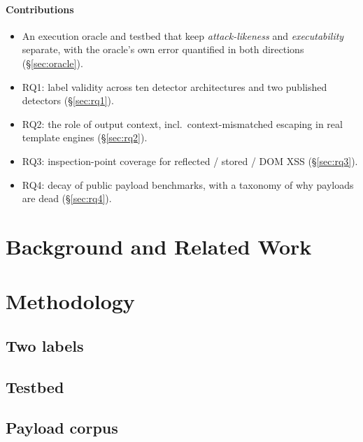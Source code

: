 \documentclass[sigconf,anonymous,review]{acmart}
\begin{document}
\paragraph{Contributions}
\begin{itemize}
  \item An execution oracle and testbed that keep \emph{attack-likeness} and \emph{executability} separate, with the oracle's own error quantified in both directions (\S\ref{sec:oracle}).
  \item RQ1: label validity across ten detector architectures and two published detectors (\S\ref{sec:rq1}).
  \item RQ2: the role of output context, incl.\ context-mismatched escaping in real template engines (\S\ref{sec:rq2}).
  \item RQ3: inspection-point coverage for reflected / stored / DOM XSS (\S\ref{sec:rq3}).
  \item RQ4: decay of public payload benchmarks, with a taxonomy of why payloads are dead (\S\ref{sec:rq4}).
\end{itemize}

\section{Background and Related Work}

\section{Methodology}
\subsection{Two labels}
\subsection{Testbed}            %
\subsection{Payload corpus}     %
\end{document}
